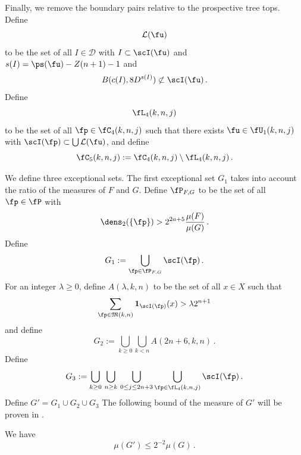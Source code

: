 Finally, we remove the boundary pairs relative to the prospective tree tops. Define
\begin{equation}
    \label{eq-L-def}
    \mathcal{L}(\fu)
\end{equation}
to be the set of all $I \in \mathcal{D}$ with $I \subset \scI(\fu)$ and $s(I) = \ps(\fu) - Z(n+1) - 1$ and
\begin{equation}
    B(c(I), 8 D^{s(I)})\not \subset \scI(\fu)\, .
\end{equation}
Define
\begin{equation}
    \label{eq-L4-def}
    \fL_4(k,n,j)
\end{equation}
to be the set of all $\fp\in \fC_4(k,n,j)$ such that there exists
$\fu\in \fU_1(k,n,j)$
with $\scI(\fp) \subset \bigcup \mathcal{L}(\fu)$, and define
\begin{equation}\label{defc5}
\fC_5(k,n,j):=\fC_4(k,n,j)
  \setminus \fL_4(k,n,j)\, .
\end{equation}


We define three exceptional sets.
The first exceptional set $G_1$ takes into account the ratio of the measures of $F$ and $G$.
Define $\fP_{F,G}$ to be the set of all $\fp\in \fP$
with
\begin{equation}
    \dens_2(\{\fp\})> 2^{2a+5}\frac{\mu(F)}{\mu(G)}\,.
\end{equation}
Define
\begin{equation}\label{definegone}
    G_1:=\bigcup_{\fp\in \fP_{F,G} }\scI(\fp)\, .
\end{equation}
For an integer $\lambda\ge 0$, define $A(\lambda,k,n)$ to be the set
of all $x\in X$ such that
\begin{equation}
    \label{eq-Aoverlap-def}
    \sum_{\fp \in \mathfrak{M}(k,n)}\mathbf{1}_{\scI(\fp)}(x)>\lambda 2^{n+1}
\end{equation}
and define
\begin{equation}\label{definegone2}
    G_2:=
\bigcup_{k\ge 0}\bigcup_{k< n}
A(2n+6,k,n)\, .
\end{equation}
Define
    \begin{equation}\label{defineg3}
        G_3 :=
        \bigcup_{k\ge 0}\, \bigcup_{n \geq k}\,
        \bigcup_{0\le j\le 2n+3}
        \bigcup_{\fp \in \fL_4 (k,n,j)}
        \scI(\fp)\, .
     \end{equation}
Define $G'=G_1\cup G_2 \cup G_3$
The following bound of the measure of $G'$ will be proven in
.
\begin{lemma}
    \label{exceptional-set}
    \leanok
    We have
    \begin{equation}
        \mu(G')\le 2^{-2}\mu(G)\, .
    \end{equation}
\end{lemma}


